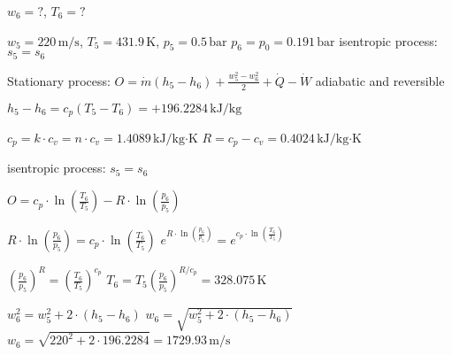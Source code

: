 \( w_6 = ? \), \( T_6 = ? \)  

\( w_5 = 220 \, \text{m/s} \), \( T_5 = 431.9 \, \text{K} \), \( p_5 = 0.5 \, \text{bar} \)  
\( p_6 = p_0 = 0.191 \, \text{bar} \)  
isentropic process: \( s_5 = s_6 \)  

Stationary process:  
\( O = \dot{m} \left( h_5 - h_6 \right) + \frac{w_5^2 - w_6^2}{2} + \dot{Q} - \dot{W} \)  
adiabatic and reversible  

\( h_5 - h_6 = c_p \left( T_5 - T_6 \right) = + 196.2284 \, \text{kJ/kg} \)  

\( c_p = k \cdot c_v = n \cdot c_v = 1.4089 \, \text{kJ/kg·K} \)  
\( R = c_p - c_v = 0.4024 \, \text{kJ/kg·K} \)  

isentropic process: \( s_5 = s_6 \)  

\( O = c_p \cdot \ln \left( \frac{T_6}{T_5} \right) - R \cdot \ln \left( \frac{p_6}{p_5} \right) \)  

\( R \cdot \ln \left( \frac{p_6}{p_5} \right) = c_p \cdot \ln \left( \frac{T_6}{T_5} \right) \)  
\( e^{R \cdot \ln \left( \frac{p_6}{p_5} \right)} = e^{c_p \cdot \ln \left( \frac{T_6}{T_5} \right)} \)  

\( \left( \frac{p_6}{p_5} \right)^R = \left( \frac{T_6}{T_5} \right)^{c_p} \)  
\( T_6 = T_5 \left( \frac{p_6}{p_5} \right)^{R/c_p} = 328.075 \, \text{K} \)  

\( w_6^2 = w_5^2 + 2 \cdot (h_5 - h_6) \)  
\( w_6 = \sqrt{w_5^2 + 2 \cdot (h_5 - h_6)} \)  
\( w_6 = \sqrt{220^2 + 2 \cdot 196.2284} = 1729.93 \, \text{m/s} \)